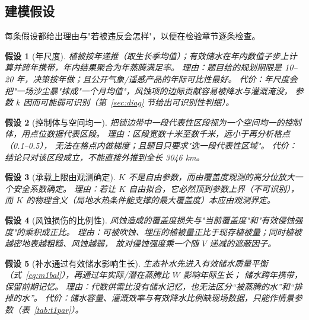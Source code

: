\documentclass[11pt,a4paper]{ctexart}
\newtheorem{assumption}{假设}
\begin{document}
\subsection{建模假设}

每条假设都给出理由与"若被违反会怎样"，以便在检验章节逐条检查。

\begin{assumption}[年尺度]\label{as:year}
植被按年递推（取生长季均值）；有效储水在年内数值子步上计算并跨年携带，年内结果聚合为年蒸腾满足率。
\emph{理由}：题目给的规划期限是 10--20 年，决策按年做；且公开气象/遥感产品的年际可比性最好。
\emph{代价}：年尺度会把"一场沙尘暴"抹成"一个月均值"，风蚀项的边际贡献容易被降水与灌溉淹没，
参数 $k$ 因而可能弱可识别（第~\ref{sec:diag} 节给出可识别性判据）。
\end{assumption}

\begin{assumption}[控制体与空间均一]\label{as:box}
把锁边带中一段代表性区段视为一个空间均一的控制体，用点位数据代表区段。
\emph{理由}：区段宽数十米至数千米，远小于再分析格点（0.1\textdegree--0.5\textdegree），
无法在格点内做梯度；且题目只要求"选一段代表性区域"。
\emph{代价}：结论只对该区段成立，不能直接外推到全长 3046 km。
\end{assumption}

\begin{assumption}[承载上限由观测确定]\label{as:K}
$K$ 不是自由参数，而由覆盖度观测的高分位放大一个安全系数确定。
\emph{理由}：若让 $K$ 自由拟合，它必然顶到参数上界（不可识别），
而 $K$ 的物理含义（局地水热条件能支撑的最大覆盖度）本应由观测界定。
\end{assumption}

\begin{assumption}[风蚀损伤的比例性]\label{as:erosion}
风蚀造成的覆盖度损失与"当前覆盖度"和"有效侵蚀强度"的乘积成正比。
\emph{理由}：可被吹蚀、埋压的植被量正比于现存植被量；同时植被越密地表越粗糙、风蚀越弱，
故对侵蚀强度乘一个随 $V$ 递减的遮蔽因子。
\end{assumption}

\begin{assumption}[补水通过有效储水影响生长]\label{as:water}
生态补水先进入有效储水质量平衡（式~\eqref{eq:m1bal}），再通过年实际/潜在蒸腾比 $\overline W$ 影响年际生长；
储水跨年携带，保留前期记忆。
\emph{理由}：代数供需比没有储水记忆，也无法区分“被蒸腾的水”和“排掉的水”。
\emph{代价}：储水容量、灌溉效率与有效降水比例缺现场数据，只能作情景参数（表~\ref{tab:t1par}）。
\end{assumption}
\end{document}
